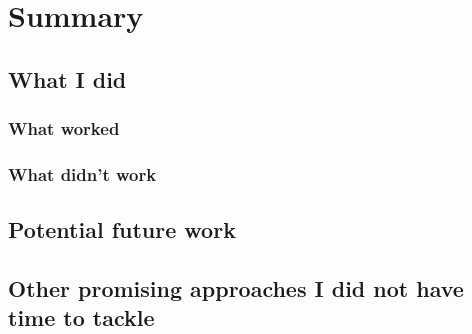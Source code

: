 \chapter{Summary}
	\section{What I did}
		\subsection{What worked}
	
		\subsection{What didn't work}
	
	\section{Potential future work}
	
	\section{Other promising approaches I did not have time to tackle}
	
